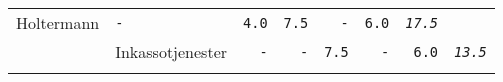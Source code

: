 \documentclass[11pt,A4paper,]{article}
\begin{document}
\begin{longtable}[]{@{}llrrrrrr@{}}
\begin{minipage}[t]{0.12\columnwidth}
Holtermann\strut
\end{minipage} & \begin{minipage}[t]{0.12\columnwidth}\raggedleft\strut
\texttt{-}\strut
\end{minipage} & \begin{minipage}[t]{0.12\columnwidth}\raggedleft\strut
\texttt{4.0}\strut
\end{minipage} & \begin{minipage}[t]{0.12\columnwidth}\raggedleft\strut
\texttt{7.5}\strut
\end{minipage} & \begin{minipage}[t]{0.12\columnwidth}\raggedleft\strut
\texttt{-}\strut
\end{minipage} & \begin{minipage}[t]{0.12\columnwidth}\raggedleft\strut
\texttt{6.0}\strut
\end{minipage} & \begin{minipage}[t]{0.12\columnwidth}\raggedleft\strut
\emph{\texttt{17.5}}\strut
\end{minipage}\tabularnewline
\begin{minipage}[t]{0.12\columnwidth}\raggedright\strut
\strut
\end{minipage} & \begin{minipage}[t]{0.12\columnwidth}\raggedright\strut
Inkassotjenester\strut
\end{minipage} & \begin{minipage}[t]{0.12\columnwidth}\raggedleft\strut
\texttt{-}\strut
\end{minipage} & \begin{minipage}[t]{0.12\columnwidth}\raggedleft\strut
\texttt{-}\strut
\end{minipage} & \begin{minipage}[t]{0.12\columnwidth}\raggedleft\strut
\texttt{7.5}\strut
\end{minipage} & \begin{minipage}[t]{0.12\columnwidth}\raggedleft\strut
\texttt{-}\strut
\end{minipage} & \begin{minipage}[t]{0.12\columnwidth}\raggedleft\strut
\texttt{6.0}\strut
\end{minipage} & \begin{minipage}[t]{0.12\columnwidth}\raggedleft\strut
\emph{\texttt{13.5}}\strut
\end{minipage}\tabularnewline
\begin{minipage}[t]{0.12\columnwidth}\raggedright\strut
\strut
\end{minipage} & \begin{minipage}[t]{0.12\columnwidth}\raggedright\strut

\end{minipage}
\end{longtable}
\end{document}
